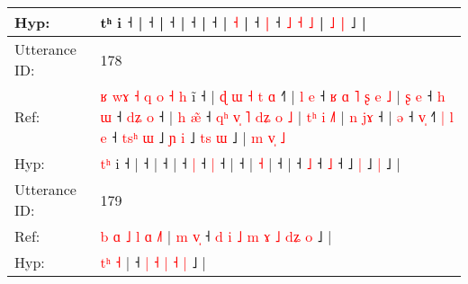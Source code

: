 \documentclass[10pt]{article}
\DeclareRobustCommand{\hl}[1]{{\textcolor{red}{#1}}}
\begin{document}
\begin{longtable}{ll}
 \\
Hyp: & \hl{}\hl{}\hl{}\hl{}\hl{}\hl{}\hl{}\hl{}\hl{}\hl{}\hl{}\hl{}\hl{}\hl{}\hl{}tʰ i ˧\hl{}\hl{}\hl{}\hl{}\hl{}\hl{}\hl{}\hl{}\hl{}\hl{}\hl{}\hl{}\hl{} |\hl{}\hl{}\hl{}\hl{}\hl{} ˧ |\hl{}\hl{}\hl{}\hl{} ˧\hl{}\hl{}\hl{}\hl{}\hl{}\hl{}\hl{}\hl{}\hl{}\hl{}\hl{}\hl{} |\hl{}\hl{}\hl{}\hl{}\hl{} ˧ |\hl{}\hl{}\hl{}\hl{} ˧ |\hl{}\hl{}\hl{}\hl{}\hl{} \hl{}\hl{˧} |\hl{}\hl{}\hl{}\hl{} ˧\hl{}\hl{} \hl{|} ˧ \hl{˩} \hl{˧} \hl{˩} |\hl{}\hl{}\hl{}\hl{}\hl{}\hl{} \hl{˩} \hl{|} ˩ |
 \\
\midrule
Utterance ID: & 178 \\
Ref: & \hl{ʁ}\hl{ }\hl{w}\hl{ɤ}\hl{ }\hl{˧}\hl{ }\hl{q}\hl{ }\hl{o}\hl{ }\hl{˧}\hl{ }\hl{h} i\hl{̃} ˧ |\hl{ }\hl{ɖ}\hl{ }\hl{ɯ}\hl{ }\hl{˧}\hl{ }\hl{t}\hl{ }\hl{ɑ} ˧\hl{˥} |\hl{ }\hl{l}\hl{ }\hl{e} ˧\hl{ }\hl{ʁ}\hl{ }\hl{ɑ}\hl{ }\hl{˥}\hl{ }\hl{ʂ}\hl{ }\hl{e}\hl{ }\hl{˩} |\hl{ }\hl{ʂ}\hl{ }\hl{e} ˧\hl{ }\hl{h} \hl{ɯ} ˧\hl{ }\hl{d}\hl{ʑ} \hl{o} ˧ |\hl{ }\hl{h}\hl{ }\hl{æ}\hl{̃} ˧\hl{ }\hl{q}\hl{ʰ}\hl{ }\hl{v}\hl{̩}\hl{ }\hl{˥}\hl{ }\hl{d}\hl{ʑ}\hl{ }\hl{o}\hl{ }\hl{˩} |\hl{ }\hl{t}\hl{ʰ}\hl{ }\hl{i} \hl{˩}\hl{˥} |\hl{ }\hl{n}\hl{ }\hl{j}\hl{ɤ} ˧ |\hl{ }\hl{ə} ˧ \hl{v}\hl{̩} ˧\hl{˥}\hl{ }\hl{|}\hl{ }\hl{l} \hl{e} ˧\hl{ }\hl{t}\hl{s}\hl{ʰ}\hl{ }\hl{ɯ} ˩\hl{ }\hl{ɲ} \hl{i} ˩\hl{ }\hl{t}\hl{s} \hl{ɯ} ˩ |\hl{ }\hl{m}\hl{ }\hl{v}\hl{̩}\hl{ }\hl{˩}
 \\
Hyp: & \hl{}\hl{}\hl{}\hl{}\hl{}\hl{}\hl{}\hl{}\hl{}\hl{}\hl{}\hl{}\hl{t}\hl{ʰ} i\hl{} ˧ |\hl{}\hl{}\hl{}\hl{}\hl{}\hl{}\hl{}\hl{}\hl{}\hl{} ˧\hl{} |\hl{}\hl{}\hl{}\hl{} ˧\hl{}\hl{}\hl{}\hl{}\hl{}\hl{}\hl{}\hl{}\hl{}\hl{}\hl{}\hl{} |\hl{}\hl{}\hl{}\hl{} ˧\hl{}\hl{} \hl{|} ˧\hl{}\hl{}\hl{} \hl{|} ˧ |\hl{}\hl{}\hl{}\hl{}\hl{} ˧\hl{}\hl{}\hl{}\hl{}\hl{}\hl{}\hl{}\hl{}\hl{}\hl{}\hl{}\hl{}\hl{}\hl{}\hl{} |\hl{}\hl{}\hl{}\hl{}\hl{} \hl{}\hl{˧} |\hl{}\hl{}\hl{}\hl{}\hl{} ˧ |\hl{}\hl{} ˧ \hl{}\hl{˩} ˧\hl{}\hl{}\hl{}\hl{}\hl{} \hl{˩} ˧\hl{}\hl{}\hl{}\hl{}\hl{}\hl{} ˩\hl{}\hl{} \hl{|} ˩\hl{}\hl{}\hl{} \hl{|} ˩ |\hl{}\hl{}\hl{}\hl{}\hl{}\hl{}\hl{}
 \\
\midrule
Utterance ID: & 179 \\
Ref: & \hl{b}\hl{ }\hl{ɑ}\hl{ }\hl{˩}\hl{ }\hl{l}\hl{ }\hl{ɑ} \hl{˩}\hl{˥} |\hl{ }\hl{m}\hl{ }\hl{v}\hl{̩} ˧\hl{ }\hl{d}\hl{ }\hl{i}\hl{ }\hl{˩} \hl{m} \hl{ɤ} \hl{˩} \hl{d}\hl{ʑ} \hl{o} ˩ |
 \\
Hyp: & \hl{}\hl{}\hl{}\hl{}\hl{}\hl{}\hl{}\hl{t}\hl{ʰ} \hl{}\hl{˧} |\hl{}\hl{}\hl{}\hl{}\hl{} ˧\hl{}\hl{}\hl{}\hl{}\hl{}\hl{} \hl{|} \hl{˧} \hl{|} \hl{}\hl{˧} \hl{|} ˩ |
 \\

\end{longtable}
\end{document}
